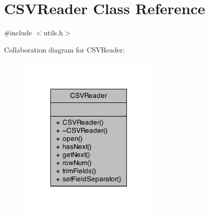 \hypertarget{class_c_s_v_reader}{\section{C\+S\+V\+Reader Class Reference}
\label{class_c_s_v_reader}
}


{\ttfamily \#include $<$utils.\+h$>$}



Collaboration diagram for C\+S\+V\+Reader\+:\nopagebreak
\begin{figure}[H]
\begin{center}
\leavevmode
\includegraphics[width=192pt]{class_c_s_v_reader__coll__graph}
\end{center}
\end{figure}
